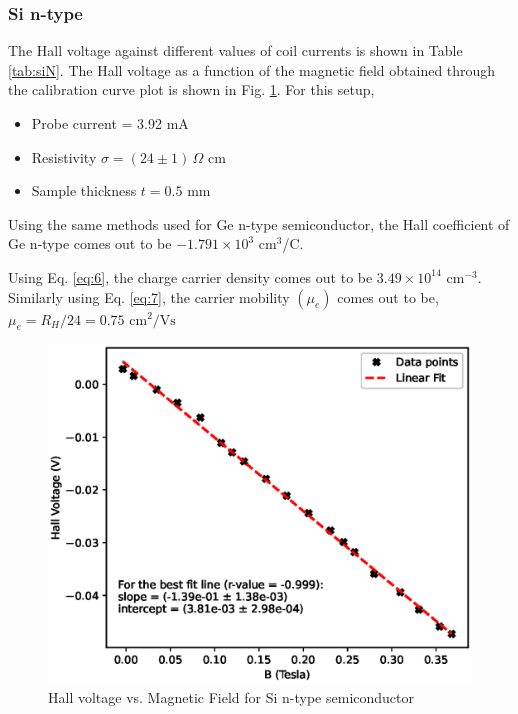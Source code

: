 \subsubsection{Si n-type}
The Hall voltage against different values of coil currents is shown in Table \ref{tab:siN}. The Hall voltage as a function of the magnetic field obtained through the calibration curve plot is shown in Fig. \ref{fig:siN}. For this setup,

\begin{itemize}
    \item Probe current = 3.92 mA
    \item Resistivity $\sigma = (24 \pm 1)\,\Omega$ cm 
    \item Sample thickness $t= 0.5$ mm\\
\end{itemize}

\noindent Using the same methods used for Ge n-type semiconductor, the Hall coefficient of Ge n-type comes out to be $-1.791\times 10^3$ cm$^3$/C.

Using Eq. \ref{eq:6}, the charge carrier density comes out to be $3.49 \times 10^{14}$ cm$^{-3}$. Similarly using Eq. \ref{eq:7}, the carrier mobility $(\mu_e)$ comes out to be,
$ \mu_e = R_H / 24 = 0.75\text{ cm}^2/\text{Vs}$



\begin{figure}[H]
    \centering
    \includegraphics[width=1\columnwidth]{images/si-n.eps}
    \caption{Hall voltage vs. Magnetic Field for Si n-type semiconductor}
    \label{fig:siN}
\end{figure}

